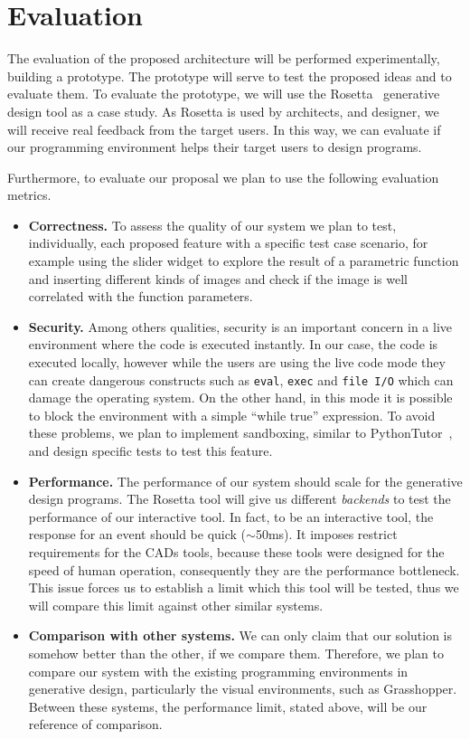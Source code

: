 
% 
% 
\section{Evaluation}
\label{sec:eval}

The evaluation of the proposed architecture will be performed experimentally, building a prototype. The prototype will serve to test the proposed ideas and to evaluate them. To evaluate the prototype, we will use the Rosetta~\cite{lopes2011portable} generative design tool as a case study. As Rosetta is used by architects, and designer, we will receive real feedback from the target users. In this way, we can evaluate if our programming environment helps their target users to design programs.

Furthermore, to evaluate our proposal we plan to use the following evaluation metrics.

\begin{itemize}
\item \textbf{Correctness.} To assess the quality of our system we plan to test, individually, each proposed feature with a specific test case scenario, for example using the slider widget to explore the result of a parametric function and inserting different kinds of images and check if the image is well correlated with the function parameters. 

\item \textbf{Security.} Among others qualities, security is an important concern in a live environment where the code is executed instantly. In our case, the code is executed locally, however while the users are using the live code mode they can create dangerous constructs such as \texttt{eval}, \texttt{exec} and \texttt{file I/O} which can damage the operating system. On the other hand, in this mode it is possible to block the environment with a simple ``while true'' expression. To avoid these problems, we plan to implement sandboxing, similar to PythonTutor~\cite{GuoSIGCSE2013}, and design specific tests to test this feature.

\item \textbf{Performance.} The performance of our system should scale for the generative design programs. The Rosetta tool will give us different \textit{backends} to test the performance of our interactive tool. In fact, to be an interactive tool, the response for an event should be quick ($\sim$50ms). It imposes restrict requirements for the CADs tools, because these tools were designed for the speed of human operation, consequently they are the performance bottleneck. This issue forces us to establish a limit which this tool will be tested, thus we will compare this limit against other similar systems.

\item \textbf{Comparison with other systems.} We can only claim that our solution is somehow better than the other, if we compare them. Therefore, we plan to compare our system with the existing programming environments in generative design, particularly the visual environments, such as Grasshopper. Between these systems, the performance limit, stated above, will be our reference of comparison.
\end{itemize}